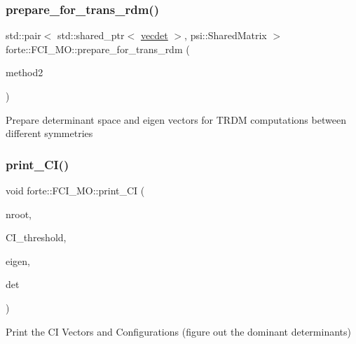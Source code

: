\subsubsection{\texorpdfstring{prepare\+\_\+for\+\_\+trans\+\_\+rdm()}{prepare\_for\_trans\_rdm()}}
{\footnotesize\ttfamily std\+::pair$<$ std\+::shared\+\_\+ptr$<$ \mbox{\hyperlink{fci__mo_8h_a777ccac2de1a8940d2f654e59ff12f06}{vecdet}} $>$, psi\+::\+Shared\+Matrix $>$ forte\+::\+F\+C\+I\+\_\+\+M\+O\+::prepare\+\_\+for\+\_\+trans\+\_\+rdm (\begin{DoxyParamCaption}\item[{std\+::shared\+\_\+ptr$<$ \mbox{\hyperlink{classforte_1_1_f_c_i___m_o}{F\+C\+I\+\_\+\+MO}} $>$}]{method2 }\end{DoxyParamCaption})\hspace{0.3cm}{\ttfamily [protected]}}

Prepare determinant space and eigen vectors for T\+R\+DM computations between different symmetries \mbox{\label{classforte_1_1_f_c_i___m_o_a5186601ac16988bc980539e43adae269}} 
\subsubsection{\texorpdfstring{print\+\_\+\+C\+I()}{print\_CI()}}
{\footnotesize\ttfamily void forte\+::\+F\+C\+I\+\_\+\+M\+O\+::print\+\_\+\+CI (\begin{DoxyParamCaption}\item[{const int \&}]{nroot,  }\item[{const double \&}]{C\+I\+\_\+threshold,  }\item[{const std\+::vector$<$ std\+::pair$<$ psi\+::\+Shared\+Vector, double $>$$>$ \&}]{eigen,  }\item[{const \mbox{\hyperlink{fci__mo_8h_a777ccac2de1a8940d2f654e59ff12f06}{vecdet}} \&}]{det }\end{DoxyParamCaption})\hspace{0.3cm}{\ttfamily [protected]}}



Print the CI Vectors and Configurations (figure out the dominant determinants) 

\mbox{\label{classforte_1_1_f_c_i___m_o_a717f27492fa3693391a81850a0973c1c}} 

